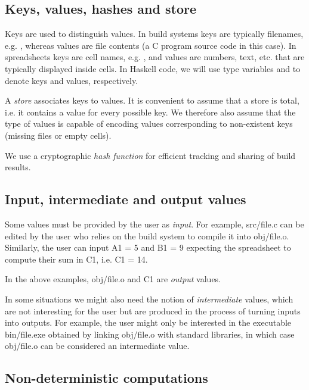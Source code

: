 \subsection{Keys, values, hashes and store}

Keys are
used to distinguish values. In build systems keys are typically filenames, e.g.
, whereas values are file contents (a C program source code in this
case). In spreadsheets keys are cell names, e.g. , and values are
numbers, text, etc. that are typically displayed inside cells. In Haskell code,
we will use type variables  and  to denote keys and values,
respectively.


A \emph{store} associates keys to values. It is convenient to assume that a store
is total, i.e. it contains a value for every possible key. We therefore also
assume that the type of values is capable of encoding values corresponding to
non-existent keys (missing files or empty cells).

We use a cryptographic \emph{hash function}  for
efficient tracking and sharing of build results.

\subsection{Input, intermediate and output values}

Some values must be provided by the user as \emph{input}. For example,
\textsf{src/file.c} can be edited by the user who relies on the build system to
compile it into \textsf{obj/file.o}. Similarly, the user can input \textsf{A1 = 5}
and \textsf{B1 = 9} expecting the spreadsheet to compute their sum in \textsf{C1},
i.e. \textsf{C1 = 14}.

In the above examples, \textsf{obj/file.o} and \textsf{C1} are \emph{output} values.

In some situations we might also need the notion of \emph{intermediate} values,
which are not interesting for the user but are produced in the process of turning
inputs into outputs. For example, the user might only be interested in the
executable \textsf{bin/file.exe} obtained by linking \textsf{obj/file.o} with
standard libraries, in which case \textsf{obj/file.o} can be considered an
intermediate value.

\subsection{Non-deterministic computations}

